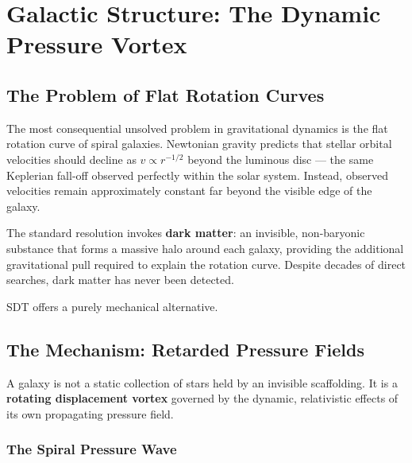
\chapter{Galactic Structure: The Dynamic Pressure Vortex}
\label{ch:galactic-structure}


\section{The Problem of Flat Rotation Curves}
\label{sec:rotation-curves}

The most consequential unsolved problem in gravitational dynamics is the flat rotation curve of spiral galaxies.  Newtonian gravity predicts that stellar orbital velocities should decline as $v \propto r^{-1/2}$ beyond the luminous disc --- the same Keplerian fall-off observed perfectly within the solar system.  Instead, observed velocities remain approximately constant far beyond the visible edge of the galaxy.

The standard resolution invokes \textbf{dark matter}: an invisible, non-baryonic substance that forms a massive halo around each galaxy, providing the additional gravitational pull required to explain the rotation curve.  Despite decades of direct searches, dark matter has never been detected.

SDT offers a purely mechanical alternative.


\section{The Mechanism: Retarded Pressure Fields}
\label{sec:retarded-field}

A galaxy is not a static collection of stars held by an invisible scaffolding.  It is a \textbf{rotating displacement vortex} governed by the dynamic, relativistic effects of its own propagating pressure field.

\subsection{The Spiral Pressure Wave}

